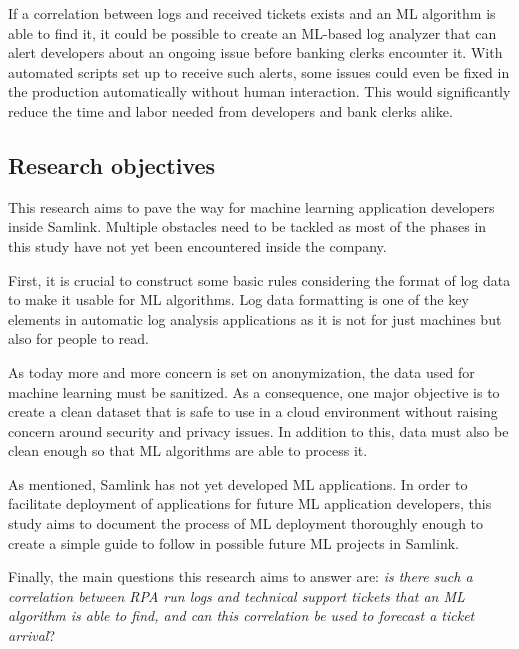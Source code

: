 If a correlation between logs and received tickets exists
and an ML algorithm is able to find it,
it could be possible to create an ML-based log analyzer
that can alert developers
about an ongoing issue before banking clerks encounter it.
With automated scripts set up to receive such alerts,
some issues could even be fixed in the production
automatically without human interaction.
This would significantly reduce the time and labor needed
from developers and bank clerks alike.


\subsection{Research objectives}\label{subsec:intro-research-objectives}
This research aims to
pave the way for machine learning application developers
inside Samlink.
Multiple obstacles need to be tackled
as most of the phases in this study
have not yet been encountered inside the company.

First,
it is crucial to construct some basic rules
considering the format of log data
to make it usable for ML algorithms.
Log data formatting
is one of the key elements in automatic log analysis applications
as it is not for just machines
but also for people to read.

As today more and more concern is set on anonymization,
the data used for machine learning must be sanitized.
As a consequence,
one major objective is to create a clean dataset
that is safe to use in a cloud environment
without raising concern around security and privacy issues.
In addition to this,
data must also be clean enough
so that ML algorithms
are able to process it.

As mentioned,
Samlink has not yet developed ML applications.
In order to facilitate deployment of applications
for future ML application developers,
this study aims to document the process of ML deployment
thoroughly enough to create a simple guide to follow
in possible future ML projects in Samlink.

Finally,
the main questions this research aims to answer are:
\textit{is there such a correlation between RPA run logs and technical support tickets
that an ML algorithm is able to find,
and can this correlation be used to forecast a ticket arrival}?



